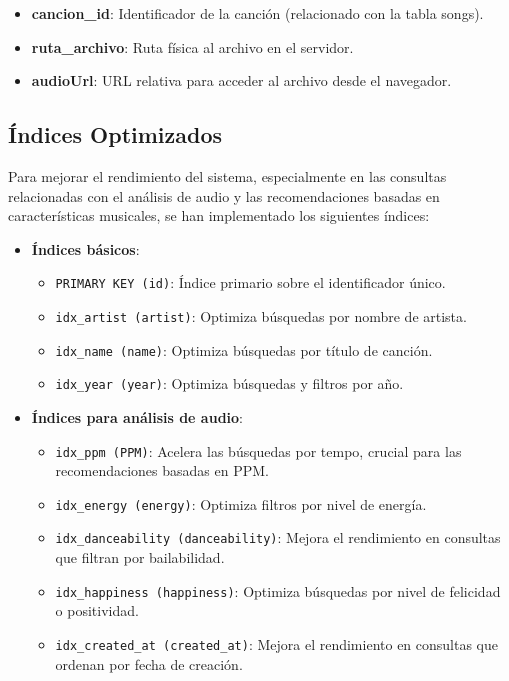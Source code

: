 \documentclass[a4paper,12pt]{article}
\begin{document}
\begin{itemize}
    \item \textbf{cancion\_id}: Identificador de la canción (relacionado con la tabla songs).
    \item \textbf{ruta\_archivo}: Ruta física al archivo en el servidor.
    \item \textbf{audioUrl}: URL relativa para acceder al archivo desde el navegador.
\end{itemize}

\subsection{Índices Optimizados}

Para mejorar el rendimiento del sistema, especialmente en las consultas relacionadas con el análisis de audio y las recomendaciones basadas en características musicales, se han implementado los siguientes índices:

\begin{itemize}
    \item \textbf{Índices básicos}:
    \begin{itemize}
        \item \texttt{PRIMARY KEY (id)}: Índice primario sobre el identificador único.
        \item \texttt{idx\_artist (artist)}: Optimiza búsquedas por nombre de artista.
        \item \texttt{idx\_name (name)}: Optimiza búsquedas por título de canción.
        \item \texttt{idx\_year (year)}: Optimiza búsquedas y filtros por año.
    \end{itemize}
    
    \item \textbf{Índices para análisis de audio}:
    \begin{itemize}
        \item \texttt{idx\_ppm (PPM)}: Acelera las búsquedas por tempo, crucial para las recomendaciones basadas en PPM.
        \item \texttt{idx\_energy (energy)}: Optimiza filtros por nivel de energía.
        \item \texttt{idx\_danceability (danceability)}: Mejora el rendimiento en consultas que filtran por bailabilidad.
        \item \texttt{idx\_happiness (happiness)}: Optimiza búsquedas por nivel de felicidad o positividad.
        \item \texttt{idx\_created\_at (created\_at)}: Mejora el rendimiento en consultas que ordenan por fecha de creación.
    \end{itemize}
\end{itemize}
\end{document}
